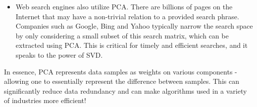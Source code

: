 \documentclass{article}
\begin{document}
\begin{itemize}
\item Web search engines also utilize PCA. There are billions of pages on the Internet that may have a non-trivial relation to a provided search phrase. Companies such as Google, Bing and Yahoo typically narrow the search space by only considering a small subset of this search matrix, which can be extracted using PCA\cite{search-clustering}. This is critical for timely and efficient searches, and it speaks to the power of SVD.
\end{itemize}

In essence, PCA represents data samples as weights on various components - allowing one to essentially represent the difference between samples. This can significantly reduce data redundancy and can make algorithms used in a variety of industries more efficient!

\small


\end{document}
